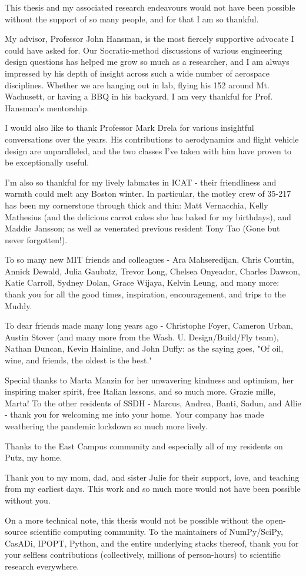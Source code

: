 This thesis and my associated research endeavours would not have been possible without the support of so many people, and for that I am so thankful.

My advisor, Professor John Hansman, is the most fiercely supportive advocate I could have asked for. Our Socratic-method discussions of various engineering design questions has helped me grow so much as a researcher, and I am always impressed by his depth of insight across such a wide number of aerospace disciplines. Whether we are hanging out in lab, flying his 152 around Mt. Wachusett, or having a BBQ in his backyard, I am very thankful for Prof. Hansman's mentorship.

I would also like to thank Professor Mark Drela for various insightful conversations over the years. His contributions to aerodynamics and flight vehicle design are unparalleled, and the two classes I've taken with him have proven to be exceptionally useful.

I'm also so thankful for my lively labmates in ICAT - their friendliness and warmth could melt any Boston winter. In particular, the motley crew of 35-217 has been my cornerstone through thick and thin: Matt Vernacchia, Kelly Mathesius (and the delicious carrot cakes she has baked for my birthdays), and Maddie Jansson; as well as venerated previous resident Tony Tao (Gone but never forgotten!).

To so many new MIT friends and colleagues - Ara Mahseredijan, Chris Courtin, Annick Dewald, Julia Gaubatz, Trevor Long, Chelsea Onyeador, Charles Dawson, Katie Carroll, Sydney Dolan, Grace Wijaya, Kelvin Leung, and many more: thank you for all the good times, inspiration, encouragement, and trips to the Muddy.

To dear friends made many long years ago - Christophe Foyer, Cameron Urban, Austin Stover (and many more from the Wash. U. Design/Build/Fly team), Nathan Duncan, Kevin Hainline, and John Duffy: as the saying goes, "Of oil, wine, and friends, the oldest is the best."

Special thanks to Marta Manzin for her unwavering kindness and optimism, her inspiring maker spirit, free Italian lessons, and so much more. Grazie mille, Marta! To the other residents of SSDH - Marcus, Andrea, Banti, Sadun, and Allie - thank you for welcoming me into your home. Your company has made weathering the pandemic lockdown so much more lively.

Thanks to the East Campus community and especially all of my residents on Putz, my home.

Thank you to my mom, dad, and sister Julie for their support, love, and teaching from my earliest days. This work and so much more would not have been possible without you.

On a more technical note, this thesis would not be possible without the open-source scientific computing community. To the maintainers of NumPy/SciPy, CasADi, IPOPT, Python, and the entire underlying stacks thereof, thank you for your selfless contributions (collectively, millions of person-hours) to scientific research everywhere.




